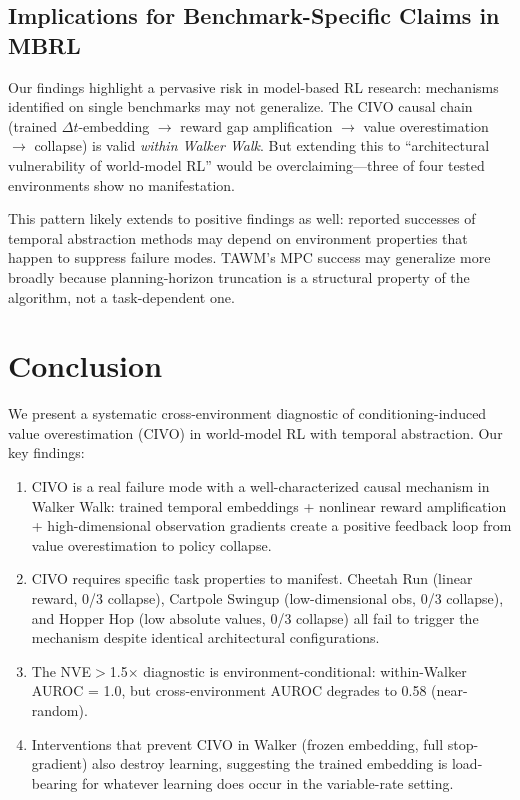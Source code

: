 \documentclass[letterpaper]{article}
\begin{document}
\subsection{Implications for Benchmark-Specific Claims in MBRL}

Our findings highlight a pervasive risk in model-based RL research: mechanisms identified on single benchmarks may not generalize. The CIVO causal chain (trained $\Delta t$-embedding $\to$ reward gap amplification $\to$ value overestimation $\to$ collapse) is valid \emph{within Walker Walk}. But extending this to ``architectural vulnerability of world-model RL'' would be overclaiming---three of four tested environments show no manifestation.

This pattern likely extends to positive findings as well: reported successes of temporal abstraction methods may depend on environment properties that happen to suppress failure modes. TAWM's MPC success may generalize more broadly because planning-horizon truncation is a structural property of the algorithm, not a task-dependent one.

\section{Conclusion}

We present a systematic cross-environment diagnostic of conditioning-induced value overestimation (CIVO) in world-model RL with temporal abstraction. Our key findings:

\begin{enumerate}
    \item CIVO is a real failure mode with a well-characterized causal mechanism in Walker Walk: trained temporal embeddings + nonlinear reward amplification + high-dimensional observation gradients create a positive feedback loop from value overestimation to policy collapse.
    \item CIVO requires specific task properties to manifest. Cheetah Run (linear reward, 0/3 collapse), Cartpole Swingup (low-dimensional obs, 0/3 collapse), and Hopper Hop (low absolute values, 0/3 collapse) all fail to trigger the mechanism despite identical architectural configurations.
    \item The NVE$>$1.5$\times$ diagnostic is environment-conditional: within-Walker AUROC = 1.0, but cross-environment AUROC degrades to 0.58 (near-random).
    \item Interventions that prevent CIVO in Walker (frozen embedding, full stop-gradient) also destroy learning, suggesting the trained embedding is load-bearing for whatever learning does occur in the variable-rate setting.
\end{enumerate}
\end{document}
